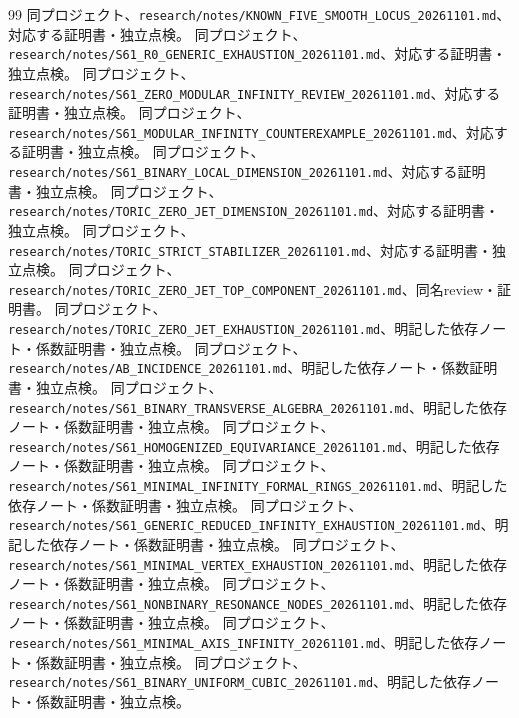 \documentclass[11pt,a4paper]{ltjsarticle}
\theoremstyle{remark}
\begin{document}
\begin{thebibliography}{99}
 同プロジェクト、\nolinkurl{research/notes/KNOWN_FIVE_SMOOTH_LOCUS_20261101.md}、対応する証明書・独立点検。
 同プロジェクト、\nolinkurl{research/notes/S61_R0_GENERIC_EXHAUSTION_20261101.md}、対応する証明書・独立点検。
 同プロジェクト、\nolinkurl{research/notes/S61_ZERO_MODULAR_INFINITY_REVIEW_20261101.md}、対応する証明書・独立点検。
 同プロジェクト、\nolinkurl{research/notes/S61_MODULAR_INFINITY_COUNTEREXAMPLE_20261101.md}、対応する証明書・独立点検。
 同プロジェクト、\nolinkurl{research/notes/S61_BINARY_LOCAL_DIMENSION_20261101.md}、対応する証明書・独立点検。
 同プロジェクト、\nolinkurl{research/notes/TORIC_ZERO_JET_DIMENSION_20261101.md}、対応する証明書・独立点検。
 同プロジェクト、\nolinkurl{research/notes/TORIC_STRICT_STABILIZER_20261101.md}、対応する証明書・独立点検。
 同プロジェクト、\nolinkurl{research/notes/TORIC_ZERO_JET_TOP_COMPONENT_20261101.md}、同名review・証明書。
 同プロジェクト、\nolinkurl{research/notes/TORIC_ZERO_JET_EXHAUSTION_20261101.md}、明記した依存ノート・係数証明書・独立点検。
 同プロジェクト、\nolinkurl{research/notes/AB_INCIDENCE_20261101.md}、明記した依存ノート・係数証明書・独立点検。
 同プロジェクト、\nolinkurl{research/notes/S61_BINARY_TRANSVERSE_ALGEBRA_20261101.md}、明記した依存ノート・係数証明書・独立点検。
 同プロジェクト、\nolinkurl{research/notes/S61_HOMOGENIZED_EQUIVARIANCE_20261101.md}、明記した依存ノート・係数証明書・独立点検。
 同プロジェクト、\nolinkurl{research/notes/S61_MINIMAL_INFINITY_FORMAL_RINGS_20261101.md}、明記した依存ノート・係数証明書・独立点検。
 同プロジェクト、\nolinkurl{research/notes/S61_GENERIC_REDUCED_INFINITY_EXHAUSTION_20261101.md}、明記した依存ノート・係数証明書・独立点検。
 同プロジェクト、\nolinkurl{research/notes/S61_MINIMAL_VERTEX_EXHAUSTION_20261101.md}、明記した依存ノート・係数証明書・独立点検。
 同プロジェクト、\nolinkurl{research/notes/S61_NONBINARY_RESONANCE_NODES_20261101.md}、明記した依存ノート・係数証明書・独立点検。
 同プロジェクト、\nolinkurl{research/notes/S61_MINIMAL_AXIS_INFINITY_20261101.md}、明記した依存ノート・係数証明書・独立点検。
 同プロジェクト、\nolinkurl{research/notes/S61_BINARY_UNIFORM_CUBIC_20261101.md}、明記した依存ノート・係数証明書・独立点検。

\end{thebibliography}
\end{document}
